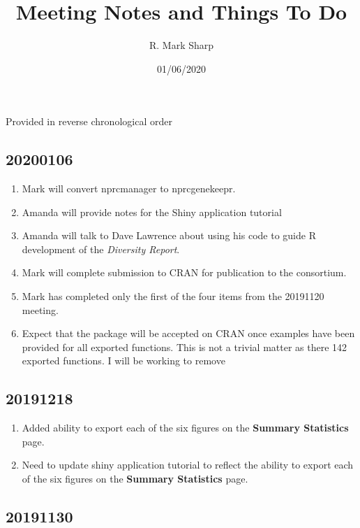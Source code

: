 \documentclass[
]{article}
\title{Meeting Notes and Things To Do}
\author{R. Mark Sharp}
\date{01/06/2020}
\providecommand{\tightlist}{%
  \setlength{\itemsep}{0pt}\setlength{\parskip}{0pt}}
\begin{document}
\maketitle

Provided in reverse chronological order

\hypertarget{section}{%
\subsection{20200106}\label{section}}

\begin{enumerate}
\def\labelenumi{\arabic{enumi}.}
\tightlist
\item
  Mark will convert nprcmanager to nprcgenekeepr.
\item
  Amanda will provide notes for the Shiny application tutorial
\item
  Amanda will talk to Dave Lawrence about using his code to guide R
  development of the \emph{Diversity Report}.
\item
  Mark will complete submission to CRAN for publication to the
  consortium.
\item
  Mark has completed only the first of the four items from the 20191120
  meeting.
\item
  Expect that the package will be accepted on CRAN once examples have
  been provided for all exported functions. This is not a trivial matter
  as there 142 exported functions. I will be working to remove
\end{enumerate}

\hypertarget{section-1}{%
\subsection{20191218}\label{section-1}}

\begin{enumerate}
\def\labelenumi{\arabic{enumi}.}
\tightlist
\item
  Added ability to export each of the six figures on the \textbf{Summary
  Statistics} page.
\item
  Need to update shiny application tutorial to reflect the ability to
  export each of the six figures on the \textbf{Summary Statistics}
  page.
\end{enumerate}

\hypertarget{section-2}{%
\subsection{20191130}\label{section-2}}
\end{document}

